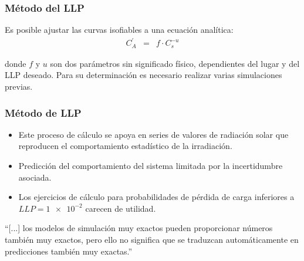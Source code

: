 \documentclass[serif, xcolor=dvipsnames]{beamer}
\begin{document}
\begin{frame}
\frametitle{Método del LLP}
\begin{block}
{}

Es posible ajustar las curvas isofiables a una ecuación analítica:\begin{eqnarray*}
C_{A}^{'} & = & f\cdot C_{s}^{-u}\end{eqnarray*}


donde $f$ y $u$ son dos parámetros sin significado físico, dependientes
del lugar y del LLP deseado. Para su determinación es necesario realizar
varias simulaciones previas.

\end{block}

\end{frame}

\begin{frame}
\frametitle{Método de LLP}
\begin{itemize}
\item Este proceso de cálculo se apoya en series de valores de radiación
solar que reproducen el comportamiento estadístico de la irradiación. 
\item Predicción del comportamiento del sistema limitada por la incertidumbre
asociada. 
\item Los ejercicios de cálculo para probabilidades de pérdida de carga
inferiores a $LLP=\num{1e-2}$ carecen de utilidad.\end{itemize}
\begin{block}
{}

{}``{[}...{]} los modelos de simulación muy exactos pueden proporcionar
números también muy exactos, pero ello no significa que se traduzcan
automáticamente en predicciones también muy exactas.''

\end{block}

\end{frame}
\end{document}
